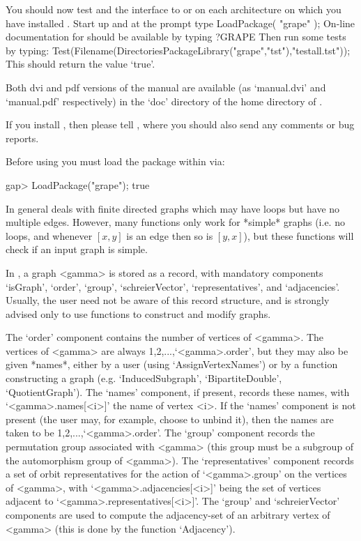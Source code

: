 You should now test {\GRAPE} and the interface to {\nauty} or {\bliss}
on each architecture on which you have installed {\GRAPE}. Start up
{\GAP} and at the prompt type 
\begintt 
LoadPackage( "grape" ); 
\endtt
On-line documentation for {\GRAPE} should be available by typing 
\begintt
?GRAPE 
\endtt 
Then run some tests by typing:
\begintt
Test(Filename(DirectoriesPackageLibrary("grape","tst"),"testall.tst"));
\endtt
This should return the value `true'.
	
Both dvi and pdf versions of the {\GRAPE} manual are available
(as `manual.dvi' and `manual.pdf' respectively) in the `doc' directory
of the home directory of {\GRAPE}.

If you install {\GRAPE}, then please tell ,
where you should also send any comments or bug reports.


Before using {\GRAPE} you must load the package within {\GAP} via: 

\begintt
gap> LoadPackage("grape");
true
\endtt

 
In general {\GRAPE} deals with finite directed graphs which may have
loops but have no multiple edges. However, many {\GRAPE} functions only
work for *simple* graphs (i.e. no loops, and whenever $[x,y]$ is an
edge then so is $[y,x]$), but these functions will check if an input
graph is simple.

In {\GRAPE}, a graph <gamma> is stored as a record, with mandatory
components `isGraph', `order', `group', `schreierVector',
`representatives', and `adjacencies'. Usually, the user need not be
aware of this record structure, and is strongly advised only to use
{\GRAPE} functions to construct and modify graphs.

The `order' component contains the number of vertices of <gamma>. The
vertices of <gamma> are always 1,2,...,`<gamma>.order', but they may also
be given *names*, either by a user (using `AssignVertexNames') or by a
function constructing a graph (e.g. `InducedSubgraph', `BipartiteDouble',
`QuotientGraph'). The `names' component, if present, records these
names, with `<gamma>.names[<i>]' the name of vertex <i>.  If the `names'
component is not present (the user may, for example, choose to unbind
it), then the names are taken to be 1,2,...,`<gamma>.order'. The `group'
component records the {\GAP} permutation group associated with <gamma>
(this group must be a subgroup of the automorphism group of <gamma>). The
`representatives' component records a set of orbit representatives
for the action of `<gamma>.group' on the vertices of <gamma>, with
`<gamma>.adjacencies[<i>]' being the set of vertices adjacent to
`<gamma>.representatives[<i>]'. The `group' and `schreierVector'
components are used to compute the adjacency-set of an arbitrary vertex
of <gamma> (this is done by the function `Adjacency').

